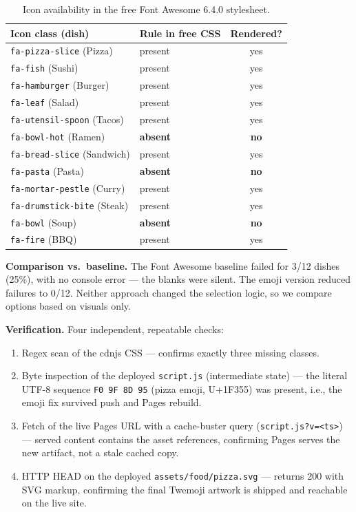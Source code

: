 \documentclass[11pt,a4paper]{article}
\begin{document}
\begin{table}[ht]
  \centering
  \caption{Icon availability in the free Font Awesome 6.4.0 stylesheet.}
  \begin{tabular}{llc}
    \toprule
    Icon class (dish) & Rule in free CSS & Rendered? \\
    \midrule
    \texttt{fa-pizza-slice} (Pizza)   & present & yes \\
    \texttt{fa-fish} (Sushi)          & present & yes \\
    \texttt{fa-hamburger} (Burger)    & present & yes \\
    \texttt{fa-leaf} (Salad)          & present & yes \\
    \texttt{fa-utensil-spoon} (Tacos) & present & yes \\
    \texttt{fa-bowl-hot} (Ramen)      & \textbf{absent} & \textbf{no} \\
    \texttt{fa-bread-slice} (Sandwich)& present & yes \\
    \texttt{fa-pasta} (Pasta)         & \textbf{absent} & \textbf{no} \\
    \texttt{fa-mortar-pestle} (Curry) & present & yes \\
    \texttt{fa-drumstick-bite} (Steak)& present & yes \\
    \texttt{fa-bowl} (Soup)           & \textbf{absent} & \textbf{no} \\
    \texttt{fa-fire} (BBQ)            & present & yes \\
    \bottomrule
  \end{tabular}
\end{table}

\textbf{Comparison vs.\ baseline.} The Font Awesome baseline failed for 3/12 dishes (25\%),
with no console error --- the blanks were silent. The emoji version reduced failures to
0/12. Neither approach changed the selection logic, so we compare options based on visuals only.

\textbf{Verification.} Four independent, repeatable checks:
\begin{enumerate}[leftmargin=2em,itemsep=1pt]
  \item Regex scan of the cdnjs CSS --- confirms exactly three missing classes.
  \item Byte inspection of the deployed \texttt{script.js} (intermediate state) --- the
        literal UTF-8 sequence \texttt{F0 9F 8D 95} (pizza emoji, U+1F355) was present,
        i.e., the emoji fix survived push and Pages rebuild.
  \item Fetch of the live Pages URL with a cache-buster query
        (\texttt{script.js?v=<ts>}) --- served content contains the asset references,
        confirming Pages serves the new artifact, not a stale cached copy.
  \item HTTP HEAD on the deployed \texttt{assets/food/pizza.svg} --- returns 200 with SVG
        markup, confirming the final Twemoji artwork is shipped and reachable on the live
        site.
\end{enumerate}
\end{document}
